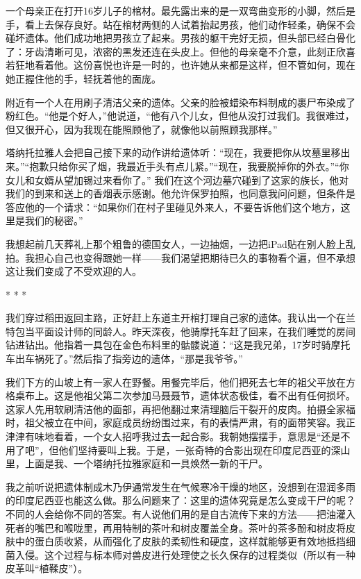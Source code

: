 \documentclass[12pt,oneside]{book}
\begin{document}
一个母亲正在打开16岁儿子的棺材。最先露出来的是一双弯曲变形的小脚，然后是手，看上去保存良好。站在棺材两侧的人试着抬起男孩，他们动作轻柔，确保不会碰坏遗体。他们成功地把男孩立了起来。男孩的躯干完好无损，但头部已经白骨化了：牙齿清晰可见，浓密的黑发还连在头皮上。但他的母亲毫不介意，此刻正欣喜若狂地看着他。这份喜悦也许是一时的，也许她从来都是这样，但不管如何，现在她正握住他的手，轻抚着他的面庞。

附近有一个人在用刷子清洁父亲的遗体。父亲的脸被蜡染布料制成的裹尸布染成了粉红色。“他是个好人，”他说道，“他有八个儿女，但他从没打过我们。我很难过，但又很开心，因为我现在能照顾他了，就像他以前照顾我那样。”

塔纳托拉雅人会把自己接下来的动作讲给遗体听：“现在，我要把你从坟墓里移出来。”“抱歉只给你买了烟，我最近手头有点儿紧。”“现在，我要脱掉你的外衣。”“你女儿和女婿从望加锡过来看你了。”
我们在这个河边墓穴碰到了这家的族长，他对我们的到来和送上的香烟表示感谢。他允许保罗拍照，也同意我问问题，但条件是答应他的一个请求：“如果你们在村子里碰见外来人，不要告诉他们这个地方，这里是我们的秘密。”

我想起前几天葬礼上那个粗鲁的德国女人，一边抽烟，一边把iPad贴在别人脸上乱拍。我担心自己也变得跟她一样——我们渴望把期待已久的事物看个遍，但不承想这让我们变成了不受欢迎的人。

\begin{center}
* * *
\end{center}

我们穿过稻田返回主路，正好赶上东道主开棺打理自己家的遗体。我认出一个在兰特包当平面设计师的同龄人。昨天深夜，他骑摩托车赶了回来，在我们睡觉的房间钻进钻出。他指着一具包在金色布料里的骷髅说道：“这是我兄弟，17岁时骑摩托车出车祸死了。”然后指了指旁边的遗体，“那是我爷爷。”

我们下方的山坡上有一家人在野餐。用餐完毕后，他们把死去七年的祖父平放在方格桌布上。这是他祖父第二次参加马聂聂节，遗体状态极佳，看不出有任何损坏。这家人先用软刷清洁他的面部，再把他翻过来清理脑后干裂开的皮肉。拍摄全家福时，祖父被立在中间，家庭成员纷纷围过来，有的表情严肃，有的面带笑容。我正津津有味地看着，一个女人招呼我过去一起合影。我朝她摆摆手，意思是“还是不用了吧”，但他们坚持要叫上我。于是，一张奇特的合影出现在印度尼西亚的深山里，上面是我、一个塔纳托拉雅家庭和一具焕然一新的干尸。

我之前听说把遗体制成木乃伊通常发生在气候寒冷干燥的地区，没想到在湿润多雨的印度尼西亚也能这么做。那么问题来了：这里的遗体究竟是怎么变成干尸的呢？不同的人会给你不同的答案。有人说他们用的是自古流传下来的方法——把油灌入死者的嘴巴和喉咙里，再用特制的茶叶和树皮覆盖全身。茶叶的茶多酚和树皮将皮肤中的蛋白质收紧，从而强化了皮肤的柔韧性和硬度，这样就能够更有效地抵挡细菌入侵。这个过程与标本师对兽皮进行处理使之长久保存的过程类似（所以有一种皮革叫“植鞣皮”）。
\end{document}
